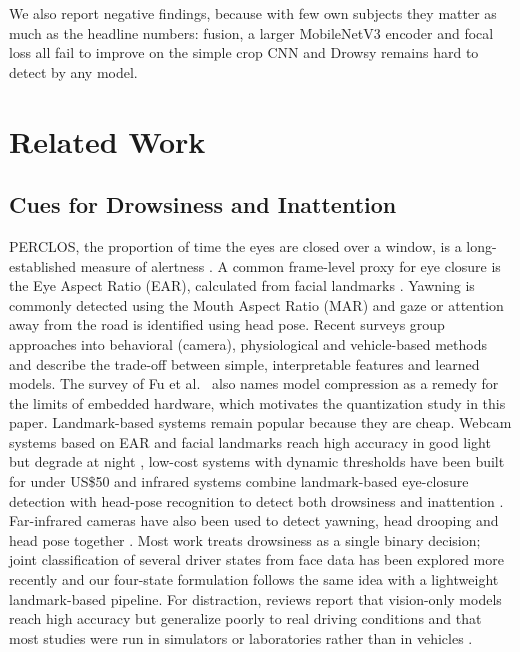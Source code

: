 \documentclass[conference]{IEEEtran}
\begin{document}
We also report negative findings, because with few own subjects they matter as much as the headline numbers: fusion, a larger MobileNetV3 encoder and focal loss all fail to improve on the simple crop CNN and Drowsy remains hard to detect by any model.



\vspace{0.2cm}
\section{Related Work}

\subsection{Cues for Drowsiness and Inattention}\label{sec:cues}
PERCLOS, the proportion of time the eyes are closed over a window, is a long-established measure of alertness \cite{perclos}. A common frame-level proxy for eye closure is the Eye Aspect Ratio (EAR), calculated from facial landmarks \cite{soukupova2016}. Yawning is commonly detected using the Mouth Aspect Ratio (MAR) and gaze or attention away from the road is identified using head pose. Recent surveys \cite{albadawi2022,fonseca2025,fu2024,fu2024app} group approaches into behavioral (camera), physiological and vehicle-based methods and describe the trade-off between simple, interpretable features and learned models. The survey of Fu et al.\ \cite{fu2024} also names model compression as a remedy for the limits of embedded hardware, which motivates the quantization study in this paper.
\newline Landmark-based systems remain popular because they are cheap. Webcam systems based on EAR and facial landmarks reach high accuracy in good light but degrade at night \cite{rao2024}, low-cost systems with dynamic thresholds have been built for under US\$50 \cite{khan2026} and infrared systems combine landmark-based eye-closure detection with head-pose recognition to detect both drowsiness and inattention \cite{kim2023}. Far-infrared cameras have also been used to detect yawning, head drooping and head pose together \cite{knapik2024}. Most work treats drowsiness as a single binary decision; joint classification of several driver states from face data has been explored more recently \cite{akhmedov2025} and our four-state formulation follows the same idea with a lightweight landmark-based pipeline. For distraction, reviews report that vision-only models reach high accuracy but generalize poorly to real driving conditions \cite{dontoh2025} and that most studies were run in simulators or laboratories rather than in vehicles \cite{john2024}.
\end{document}
